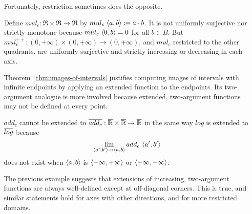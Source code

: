 \documentclass[preprint]{sigplanconf}
\begin{document}
Fortunately, restriction sometimes does the opposite.

\begin{example}
Define $mul_c : \Re \times \Re \to \Re$ by $mul_c~\langle{a,b}\rangle := a \cdot b$.
It is not uniformly surjective nor strictly monotone because $mul_c~\langle{0,b}\rangle = 0$ for all $b \in B$.
But $mul_c^{++} : (0,+\infty) \times (0,+\infty) \to (0,+\infty)$, and $mul_c$ restricted to the other quadrants, are uniformly surjective and strictly increasing or decreasing in each axis.
\exampleqed
\end{example}

Theorem~\ref{thm:images-of-intervals} justifies computing images of intervals with infinite endpoints by applying an extended function to the endpoints.
Its two-argument analogue is more involved because extended, two-argument functions may not be defined at every point.

\begin{example}
$add_c$ cannot be extended to $\cl{add_c} : \cl{\Re} \times \cl{\Re} \to \cl{\Re}$ in the same way $log$ is extended to $\cl{log}$ because
\begin{equation}
	\lim_{\langle{a',b'}\rangle \to \langle{a,b}\rangle} add_c~\langle{a',b'}\rangle
\end{equation}
does not exist when $\langle{a,b}\rangle$ is $\langle{-\infty,+\infty}\rangle$ or $\langle{+\infty,-\infty}\rangle$.
\exampleqed
\end{example}

The previous example suggests that extensions of increasing, two-argument functions are always well-defined except at off-diagonal corners.
This is true, and similar statements hold for axes with other directions, and for more restricted domains.
\end{document}
